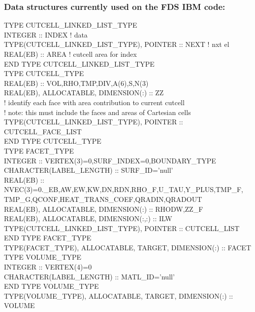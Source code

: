 \documentclass[12pt]{article}
\newenvironment{myfont}{\fontfamily{\ttdefault}\selectfont}{\par}
\begin{document}
\subsubsection*{Data structures currently used on the FDS IBM code:}

\begin{myfont}

\noindent TYPE CUTCELL\_LINKED\_LIST\_TYPE \\
\indent  INTEGER :: INDEX                                   ! data \\
\indent  TYPE(CUTCELL\_LINKED\_LIST\_TYPE), POINTER :: NEXT    ! nxt el \\
\indent   REAL(EB) :: AREA                                   ! cutcell area for index \\
\noindent END TYPE CUTCELL\_LINKED\_LIST\_TYPE \\

\noindent TYPE CUTCELL\_TYPE \\
\indent   REAL(EB) :: VOL,RHO,TMP,DIV,A(6),S,N(3) \\
\indent   REAL(EB), ALLOCATABLE, DIMENSION(:) :: ZZ \\
\indent   ! identify each face with area contribution to current cutcell \\
\indent   ! note: this must include the faces and areas of Cartesian cells \\
\indent   TYPE(CUTCELL\_LINKED\_LIST\_TYPE), POINTER :: CUTCELL\_FACE\_LIST \\
\noindent END TYPE CUTCELL\_TYPE \\

\noindent TYPE FACET\_TYPE \\
\indent   INTEGER :: VERTEX(3)=0,SURF\_INDEX=0,BOUNDARY\_TYPE \\
\indent   CHARACTER(LABEL\_LENGTH) :: SURF\_ID='null' \\
\indent   REAL(EB) :: NVEC(3)=0.\_EB,AW,EW,KW,DN,RDN,RHO\_F,U\_TAU,Y\_PLUS,TMP\_F, \\
\indent TMP\_G,QCONF,HEAT\_TRANS\_COEF,QRADIN,QRADOUT \\
\indent   REAL(EB), ALLOCATABLE, DIMENSION(:) :: RHODW,ZZ\_F \\
\indent   REAL(EB), ALLOCATABLE, DIMENSION(:,:) :: ILW \\
\indent   TYPE(CUTCELL\_LINKED\_LIST\_TYPE), POINTER :: CUTCELL\_LIST \\
\noindent END TYPE FACET\_TYPE \\

\noindent TYPE(FACET\_TYPE), ALLOCATABLE, TARGET, DIMENSION(:) :: FACET \\

\noindent TYPE VOLUME\_TYPE \\
\indent   INTEGER :: VERTEX(4)=0 \\
\indent   CHARACTER(LABEL\_LENGTH) :: MATL\_ID='null' \\
\noindent END TYPE VOLUME\_TYPE \\

\noindent TYPE(VOLUME\_TYPE), ALLOCATABLE, TARGET, DIMENSION(:) :: VOLUME \\

\end{myfont}
\end{document}
